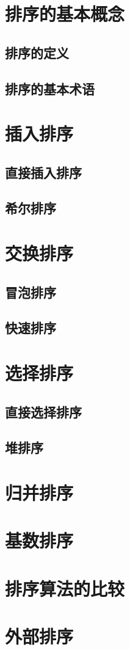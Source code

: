 \documentclass[lang=cn,newtx,10pt,scheme=chinese]{elegantbook}
\begin{document}
\section{排序的基本概念}

\subsection{排序的定义}

\subsection{排序的基本术语}

\section{插入排序}

\subsection{直接插入排序}

\subsection{希尔排序}

\section{交换排序}

\subsection{冒泡排序}

\subsection{快速排序}

\section{选择排序}

\subsection{直接选择排序}

\subsection{堆排序}

\section{归并排序}

\section{基数排序}

\section{排序算法的比较}

\section{外部排序}
\end{document}
